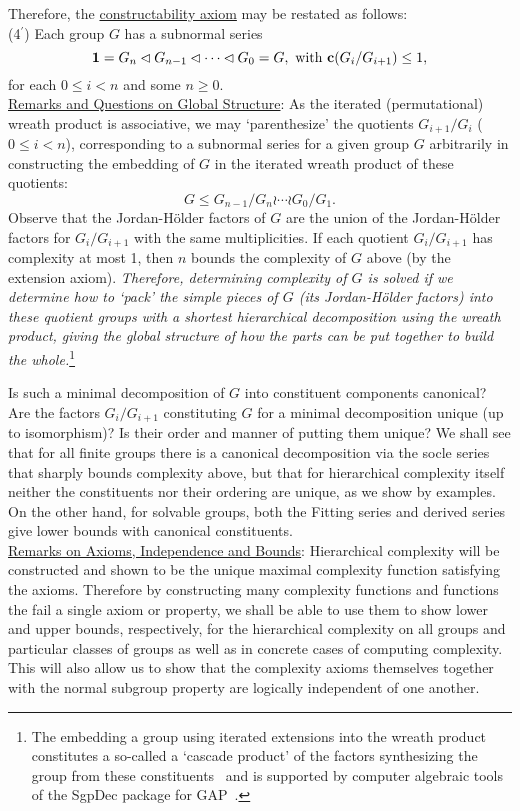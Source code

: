 \documentclass[a4paper,11pt]{amsart}
\theoremstyle{definition}
\renewcommand{\c}{\mbox{\bf c}}
\newcommand{\1}{{\mathbf 1}}
\begin{document}
Therefore,  the \underline{constructability axiom} may be restated as follows:\\

(4$^\prime$) Each group $G$ has a subnormal series 
$$\1 =G_n \lhd G_{n-1}  \lhd\cdots \lhd G_0=G, \mbox{  with  $\c(G_{i}/G_{i+1}) \leq 1$},$$
 for each $0\leq i < n$ and some $n\geq 0$.\\
 
\noindent
\underline{Remarks and Questions on Global Structure}: As the iterated (permutational) wreath product is associative, we may `parenthesize' the quotients $G_{i+1}/G_i$ ($0 \leq i < n$), corresponding to a subnormal series for a given group $G$ arbitrarily in constructing the embedding of $G$ in the iterated wreath product of these quotients:  $$G \leq G_{n-1}/G_{n} \wr \cdots \wr G_0/G_{1}.$$
Observe that the Jordan-H\"older factors of $G$ are the union of the Jordan-H\"older factors for $G_{i}/G_{i+1}$ with the same multiplicities. If each quotient $G_{i}/G_{i+1}$ has complexity at most 1, 
then $n$  bounds the complexity of $G$  above (by the extension axiom).
{\em Therefore, determining complexity of $G$ is solved if we determine how to `pack' the simple pieces of $G$ (its Jordan-H\"older factors) into these quotient groups  with a shortest hierarchical decomposition using the wreath product, giving the global structure of how the parts can be put together to build the whole.}\footnote{The embedding a group   using iterated extensions into the wreath product constitutes a so-called a `cascade product' of the factors synthesizing the group from these constituents~\cite{cascadeproduct} and is supported by computer algebraic tools of the {\sc SgpDec} package for {\sc GAP}~\cite{SgpDec}.}

Is such a minimal decomposition of $G$ into constituent components canonical? 
Are the factors $G_{i}/G_{i+1}$ constituting $G$ for a minimal decomposition unique (up to isomorphism)?  Is their order and manner of putting them unique?   We shall see that for all finite groups there is a canonical 
decomposition via the socle series that sharply bounds complexity above, but that for hierarchical complexity itself neither the constituents nor their ordering are unique, as we show by examples. 
On the other hand, for solvable groups, both the Fitting series and derived series give lower bounds with canonical constituents.\\


\noindent
\underline{Remarks on Axioms, Independence and Bounds}:
Hierarchical complexity will be constructed and shown to be the unique maximal complexity function satisfying the axioms. 
Therefore by constructing many complexity functions and functions the fail a single axiom or property, we shall be able to use them to show lower and upper bounds, respectively, for the hierarchical complexity on all groups and particular classes of groups as well as in concrete cases of computing complexity. This will also allow us to show that the complexity axioms themselves together with the normal subgroup property are logically independent of one another. 
\end{document}
